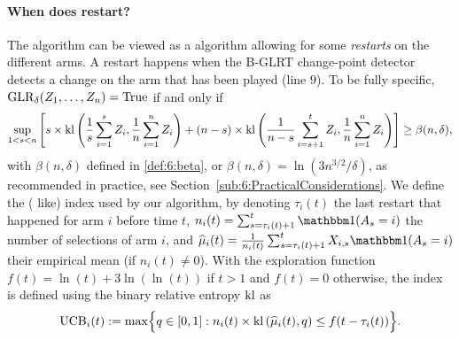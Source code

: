 \paragraph{When does \GLRklUCB{} restart?}

The \GLRklUCB{} algorithm can be viewed as a \klUCB{} algorithm allowing for some \emph{restarts} on the different arms. A restart happens when the B-GLRT change-point detector detects a change on the arm that has been played (line $9$).
%
To be fully specific, $\mathrm{GLR}_\delta(Z_1,\dots,Z_n) = \mathrm{True}$ if and only if
\begin{equation}\label{eq:whenDoesGLRklUCBrestart}
    \sup_{1 < s < n} \left[s \times \mathrm{kl} \left(\frac{1}{s}\sum_{i=1}^s Z_i , \frac{1}{n}\sum_{i=1}^n Z_i\right) + (n-s) \times \mathrm{kl} \left(\frac{1}{n-s}\sum_{i=s+1}^t Z_i , \frac{1}{n}\sum_{i=1}^n Z_i\right)\right] \geq \beta(n,\delta),
\end{equation}
%
with $\beta(n,\delta)$ defined in \eqref{def:6:beta}, or $\beta(n,\delta) = \ln(3n^{3/2}/\delta)$, as recommended in practice, see Section~\ref{sub:6:PracticalConsiderations}. We define the (\klUCB{} like) index used by our algorithm, by denoting
$\tau_i(t)$ the last restart that happened for arm $i$ before time $t$,
$n_i(t) = \sum_{s=\tau_i(t)+1}^{t} \indic(A_s=i)$
the number of selections of arm $i$, and
$\widehat{\mu}_i(t) = \frac{1}{n_i(t)} \sum_{s=\tau_i(t)+1}^{t}X_{i,s} \indic(A_s=i)$
their empirical mean (if $n_i(t)\neq0$).
%
With the exploration function $f(t) = \ln(t) + 3 \ln(\ln(t))$ if $t>1$ and $f(t)=0$ otherwise,
the index is defined using the binary relative entropy $\mathrm{kl}$ as
%
\begin{equation}\label{def:6:UCB}
    \mathrm{UCB}_i(t) := \max \Bigl\{ q\in[0,1] : n_i(t) \times \mathrm{kl}\left(\widehat{\mu}_i(t),q\right) \leq f(t - \tau_i(t)) \Bigr\}.
\end{equation}


